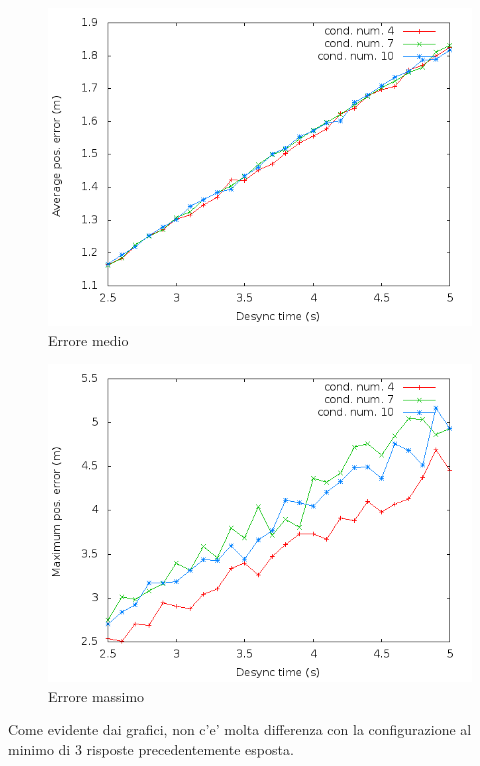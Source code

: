 \begin{figure}[H]
    \centering
    \includegraphics[scale=0.5]{octagonsimulation/avposerrorreq4preempt1drop1speed1.png}
    \caption{Errore medio}
    \label{fig:octagonsimulation/avposerrorreq4preempt1drop1speed1}
\end{figure}
\begin{figure}[H]
    \centering
    \includegraphics[scale=0.5]{octagonsimulation/maxposerrorreq4preempt1drop1speed1.png}
    \caption{Errore massimo}
    \label{fig:octagonsimulation/avposerrorreq4preempt1drop1speed1}
\end{figure}
Come evidente dai grafici, non c'e' molta differenza con la configurazione al minimo di 3 risposte precedentemente esposta.
